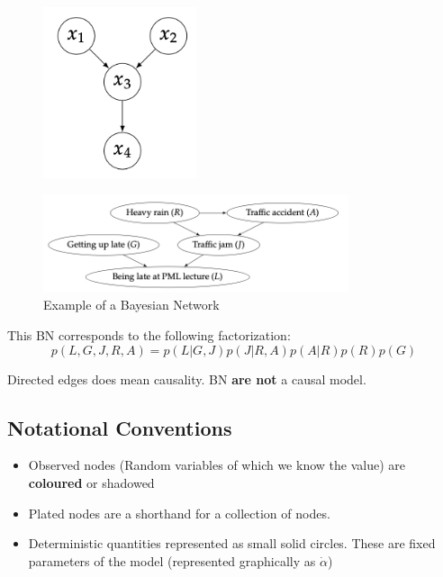 \begin{figure}[H]
    \centering
    \includegraphics[width=0.4\textwidth]{assets/fig1.png}
\end{figure}

\begin{figure}[H]
    \centering
    \includegraphics[width=0.8\textwidth]{assets/fig2.png}
    \caption{Example of a Bayesian Network}
\end{figure}

This BN corresponds to the following factorization:
\[
    p(L,G,J,R,A) = p(L|G,J)p(J|R,A)p(A|R)p(R)p(G)
\]

\begin{tipsblock}
    Directed edges does mean causality. BN \textbf{are not} a causal model.
\end{tipsblock}


\subsection*{Notational Conventions}

\begin{itemize}
    \item Observed nodes (Random variables of which we know the value) are \textbf{coloured} or shadowed
    \item Plated nodes are a shorthand for a collection of nodes. 
    \item Deterministic quantities represented as small solid circles. These are fixed parameters of the model (represented graphically as $\dot \alpha$)
\end{itemize}

